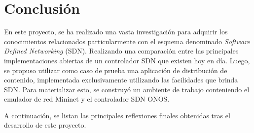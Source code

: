 
\chapter{Conclusión} %

\label{Chapter6} %
En este proyecto, se ha realizado una vasta investigación para adquirir los conocimientos relacionados particularmente con el esquema denominado \textit{Software Defined Networking} (SDN). Realizando una comparación entre las principales implementaciones abiertas de un controlador SDN que existen hoy en día. Luego, se propuso utilizar como caso de prueba una aplicación de distribución de contenido, implementada exclusivamente utilizando las facilidades que brinda SDN. Para materializar esto, se construyó un ambiente de trabajo conteniendo el emulador de red Mininet y el controlador SDN ONOS.

A continuación, se listan las principales reflexiones finales obtenidas tras el desarrollo de este proyecto.

